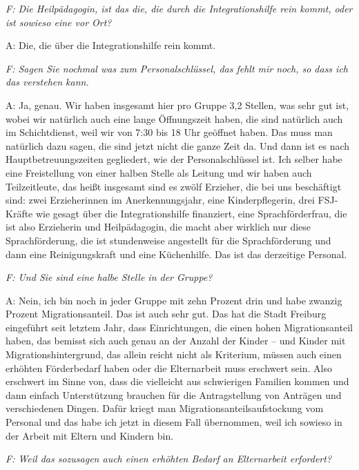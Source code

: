 \emph{F: Die Heilpädagogin, ist das die, die durch die Integrationshilfe rein kommt, oder ist sowieso eine vor Ort?}

A: Die, die über die Integrationshilfe rein kommt. 

\emph{F: Sagen Sie nochmal was zum Personalschlüssel, das fehlt mir noch, so dass ich das verstehen kann.}

A: Ja, genau. Wir haben insgesamt hier pro Gruppe 3,2 Stellen, was sehr gut ist, wobei wir natürlich auch eine lange Öffnungszeit haben, die sind natürlich auch im Schichtdienst, weil wir von 7:30 bis 18 Uhr geöffnet haben. Das muss man natürlich dazu sagen, die sind jetzt nicht die ganze Zeit da. Und dann ist es nach Hauptbetreuungszeiten gegliedert, wie der Personalschlüssel ist. Ich selber habe eine Freistellung von einer halben Stelle als Leitung und wir haben auch Teilzeitleute, das heißt insgesamt sind es zwölf Erzieher, die bei uns beschäftigt sind: zwei Erzieherinnen im Anerkennungsjahr, eine Kinderpflegerin, drei FSJ-Kräfte wie gesagt über die Integrationshilfe finanziert, eine Sprachförderfrau, die ist also Erzieherin und Heilpädagogin, die macht aber wirklich nur diese Sprachförderung, die ist stundenweise angestellt für die Sprachförderung und dann eine Reinigungskraft und eine Küchenhilfe. Das ist das derzeitige Personal.

\emph{F: Und Sie sind eine halbe Stelle in der Gruppe?}

A: Nein, ich bin noch in jeder Gruppe mit zehn Prozent drin und habe zwanzig Prozent Migrationsanteil. Das ist auch sehr gut. Das hat die Stadt Freiburg eingeführt seit letztem Jahr, dass Einrichtungen, die einen hohen Migrationsanteil haben, das bemisst sich auch genau an der Anzahl der Kinder -- und Kinder mit Migrationshintergrund, das allein reicht nicht als Kriterium, müssen auch einen erhöhten Förderbedarf haben oder die Elternarbeit muss erschwert sein. Also erschwert im Sinne von, dass die vielleicht aus schwierigen Familien kommen und dann einfach Unterstützung brauchen für die Antragstellung von Anträgen und verschiedenen Dingen. Dafür kriegt man Migrationsanteilsaufstockung vom Personal und das habe ich jetzt in diesem Fall übernommen, weil ich sowieso in der Arbeit mit Eltern und Kindern bin. 

\emph{F: Weil das sozusagen auch einen erhöhten Bedarf an Elternarbeit erfordert?}

